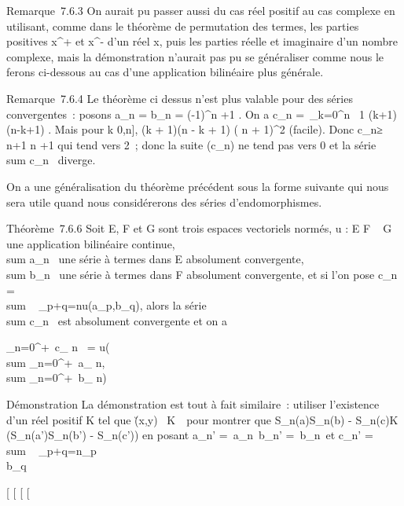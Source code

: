 \documentclass[]{article}
\begin{document}
Remarque~7.6.3 On aurait pu passer aussi du cas réel positif au cas
complexe en utilisant, comme dans le théorème de permutation des termes,
les parties positives x^+ et x^- d'un réel x, puis
les parties réelle et imaginaire d'un nombre complexe, mais la
démonstration n'aurait pas pu se généraliser comme nous le ferons
ci-dessous au cas d'une application bilinéaire plus générale.

Remarque~7.6.4 Le théorème ci dessus n'est plus valable pour des séries
convergentes~: posons a_n = b_n = (-1)^n
\over \sqrtn+1 . On a
c_n =\
\sum  _k=0^n~ 1
\over \sqrt(k+1)(n-k+1) . Mais pour
k \in {[}0,n{]}, (k + 1)(n - k + 1) \leq ( n  +
1)^2 (facile). Donc c_n≥ n+1
\over  n \over 2 +1 qui tend vers
2~; donc la suite (c_n) ne tend pas vers 0 et la série
\\sum  c_n~
diverge.

On a une généralisation du théorème précédent sous la forme suivante qui
nous sera utile quand nous considérerons des séries d'endomorphismes.

Théorème~7.6.6 Soit E, F et G sont trois espaces vectoriels normés, u :
E \times F \rightarrow~ G une application bilinéaire continue,
\\sum  a_n~ une
série à termes dans E absolument convergente,
\\sum  b_n~ une
série à termes dans F absolument convergente, et si l'on pose
c_n = \\sum ~
_p+q=nu(a_p,b_q), alors la série
\\sum  c_n~ est
absolument convergente et on a

\sum _n=0^+\infty~c_ n~ =
u\left (\\sum
_n=0^+\infty~a_ n,\\sum
_n=0^+\infty~b_ n\right )

Démonstration La démonstration est tout à fait similaire~: utiliser
l'existence d'un réel positif K tel que
\u(x,y)\ \leq
K\x\
\y\ pour montrer que
\left S_n(a)S_n(b) -
S_n(c)\right \leq K\left
(S_n(a')S_n(b') -
S_n(c')\right ) en posant a_n'
=_n\,
b_n' =\
b_n\ et c_n'
= \\sum ~
_p+q=n\a_p\\b_q\

{[}
{[}
{[}
{[}
\end{document}
